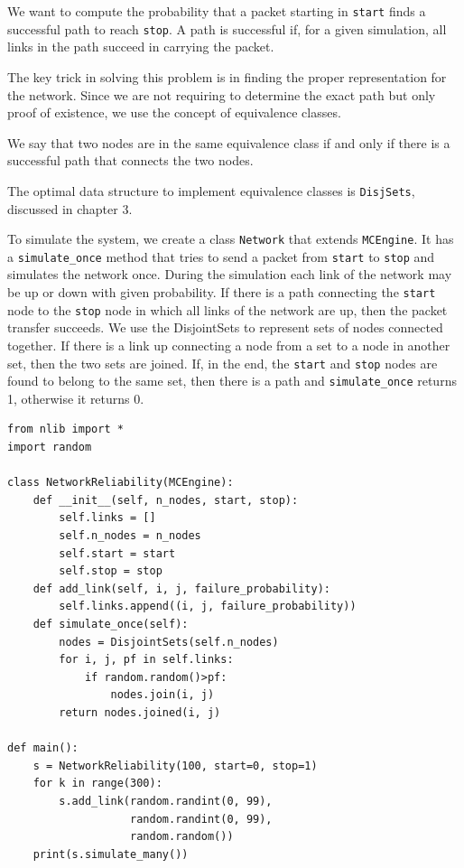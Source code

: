\documentclass[justified, sixbynine]{tufte-book}
\def\ft{\small\tt}
\theoremstyle{plain}%
\newtheorem * {corollary}{Corollary}
\theoremstyle{definition}
\theoremstyle{remark}
\newtheorem * {remark}{Remark}
\newtheorem * {note}{Note}
\begin{document}
\begin{fullwidth}
We want to compute the probability that a packet
starting in {\ft start} finds a successful path to reach {\ft stop}. A path
is successful if, for a given simulation, all links in the path succeed in
carrying the packet.

The key trick in solving this problem is in finding the proper
representation for the network. Since we are not requiring to determine the
exact path but only proof of existence, we use the concept of equivalence classes.

We say that two nodes are in the same equivalence class if and only
if there is a successful path that connects the two nodes.

The optimal data structure to implement equivalence classes is {\ft DisjSets}, discussed in chapter 3.

To simulate the system, we create a class {\ft Network} that extends {\ft MCEngine}. It has a {\ft simulate\_once} method that tries to send a packet from {\ft start} to
{\ft stop} and simulates the network once. During the simulation each link of the network may be up or down with given probability. If there is a path connecting the {\ft start} node to the {\ft stop} node in which all links of the network are up, then the packet transfer succeeds. We use the DisjointSets to represent sets of nodes connected together. If there is a link up connecting a node from a set to a node in another set, then the two sets are joined. If, in the end, the {\ft start} and {\ft stop} nodes are found to belong to the same set, then there is a path and {\ft simulate\_once} returns 1, otherwise it returns 0.


\begin{lstlisting}[caption={in file: {\ft network.py}}]
from nlib import * 
import random

class NetworkReliability(MCEngine):
    def __init__(self, n_nodes, start, stop):
        self.links = []
        self.n_nodes = n_nodes
        self.start = start
        self.stop = stop
    def add_link(self, i, j, failure_probability):
        self.links.append((i, j, failure_probability))
    def simulate_once(self):
        nodes = DisjointSets(self.n_nodes)
        for i, j, pf in self.links:
            if random.random()>pf:
                nodes.join(i, j)
        return nodes.joined(i, j)

def main():
    s = NetworkReliability(100, start=0, stop=1)
    for k in range(300):
        s.add_link(random.randint(0, 99), 
                   random.randint(0, 99), 
                   random.random())
    print(s.simulate_many())


\end{lstlisting}
\end{fullwidth}
\end{document}
